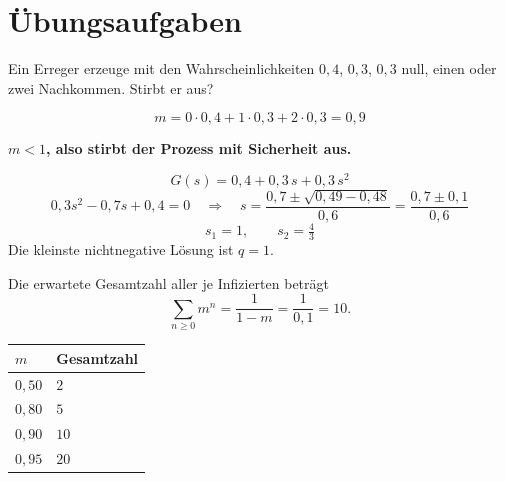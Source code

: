 \section{Übungsaufgaben}

\begin{aufgabe}
Ein Erreger erzeuge mit den Wahrscheinlichkeiten $0{,}4$, $0{,}3$, $0{,}3$ null, einen oder zwei Nachkommen. Stirbt er aus?

\loesung
{}
\[ m = 0\cdot0{,}4 + 1\cdot0{,}3 + 2\cdot0{,}3 = 0{,}9 \]

\begin{center}
\begin{minipage}{0.9\textwidth}
\textbf{$m < 1$, also stirbt der Prozess mit Sicherheit aus.}
\end{minipage}
\end{center}

\[ G(s) = 0{,}4 + 0{,}3\,s + 0{,}3\,s^{2} \]
\[ 0{,}3s^{2} - 0{,}7s + 0{,}4 = 0 \quad\Longrightarrow\quad s = \frac{0{,}7 \pm \sqrt{0{,}49-0{,}48}}{0{,}6} = \frac{0{,}7 \pm 0{,}1}{0{,}6} \]
\[ s_1 = 1, \qquad s_2 = \tfrac{4}{3} \]
Die kleinste nichtnegative Lösung ist $q = 1$. \checkmark

Die erwartete Gesamtzahl aller je Infizierten beträgt
\[ \sum_{n\ge0} m^{n} = \frac{1}{1-m} = \frac{1}{0{,}1} = 10 . \]

\begin{center}
{\small
\renewcommand{\arraystretch}{1.48}
\begin{tabular}{@{}P{1.8cm}P{2.6cm}@{}}
\toprule
$m$ & \textbf{Gesamtzahl}\\
\midrule
$0{,}50$ & $2$\\
$0{,}80$ & $5$\\
$0{,}90$ & $10$\\
$0{,}95$ & $20$\\
\bottomrule
\end{tabular}}
\end{center}

\begin{center}
\begin{minipage}{0.88\textwidth}
\end{minipage}
\end{center}
\end{aufgabe}

